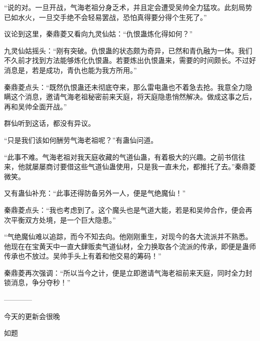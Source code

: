 \begin{this_body}
“说的对。一旦开战，气海老祖分身乏术，并且定会遭受吴帅全力猛攻。此刻局势已如水火，一旦交手绝不会轻易罢战，恐怕真得要分得个生死了。”

议论到这里，秦鼎菱又看向九灵仙姑：“仇恨蛊炼化得如何？”

九灵仙姑摇头：“刚有突破。仇恨蛊的状态颇为奇异，已然和青仇融为一体。我们不久前才找到方法能够炼化仇恨蛊。若要炼出仇恨蛊来，需要的时间颇长。不过好消息是，若是成功，青仇也能为我方所用。”

秦鼎菱点头：“既然仇恨蛊还未彻底夺来，那么雷电蛊也不着急去抢。我意全力隐瞒这个消息，邀请气海老祖秘密前来天庭，将天庭隐患悄然解决。做成这事之后，再和吴帅全面开战。”

群仙听到这话，都没有异议。

“只是我们该如何酬劳气海老祖呢？”有蛊仙问道。

“此事不难。气海老祖对我天庭收藏的气道仙蛊，有着极大的兴趣。之前书信往来，他就屡屡商讨要借这些气道仙蛊使用，只是我一直未允，都推托了去。”秦鼎菱微笑。

又有蛊仙补充：“此事还得防备另外一人，便是气绝魔仙！”

秦鼎菱点头：“我也考虑到了。这个魔头也是气道大能，若是和吴帅合作，便会再次平衡双方处境，是一个巨大隐患。”

“气绝魔仙难以追踪，而今不知去向。他刚刚重生，对现今的各大流派并不熟悉。他现在在宝黄天中一直大肆贩卖气道仙材，全力换取各个流派的传承，即便是蛊师传承也不放过。吴帅手头上有着和他交易的筹码！”

秦鼎菱再次强调：“所以当今之计，便是立即邀请气海老祖前来天庭，同时全力封锁消息，争分夺秒！”

------------

今天的更新会很晚

如题

\end{this_body}

